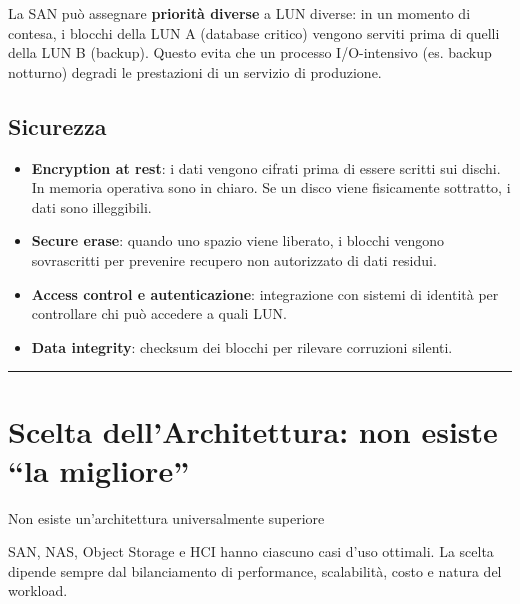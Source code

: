 \documentclass[
  italian,
  openany]{book}
\providecommand{\tightlist}{%
  \setlength{\itemsep}{0pt}\setlength{\parskip}{0pt}}
\begin{document}
La SAN può assegnare \textbf{priorità diverse} a LUN diverse: in un
momento di contesa, i blocchi della LUN A (database critico) vengono
serviti prima di quelli della LUN B (backup). Questo evita che un
processo I/O-intensivo (es. backup notturno) degradi le prestazioni di
un servizio di produzione.

\subsection{Sicurezza}\label{sicurezza-1}

\begin{itemize}
\tightlist
\item
  \textbf{Encryption at rest}: i dati vengono cifrati prima di essere
  scritti sui dischi. In memoria operativa sono in chiaro. Se un disco
  viene fisicamente sottratto, i dati sono illeggibili.
\item
  \textbf{Secure erase}: quando uno spazio viene liberato, i blocchi
  vengono sovrascritti per prevenire recupero non autorizzato di dati
  residui.
\item
  \textbf{Access control e autenticazione}: integrazione con sistemi di
  identità per controllare chi può accedere a quali LUN.
\item
  \textbf{Data integrity}: checksum dei blocchi per rilevare corruzioni
  silenti.
\end{itemize}

\begin{center}\rule{0.5\linewidth}{0.5pt}\end{center}

\section{Scelta dell'Architettura: non esiste ``la
migliore''}\label{scelta-dellarchitettura-non-esiste-la-migliore}

\begin{calloutwarning}{Non esiste un’architettura universalmente superiore}

SAN, NAS, Object Storage e HCI hanno ciascuno casi d'uso ottimali. La
scelta dipende sempre dal bilanciamento di performance, scalabilità,
costo e natura del workload.

\end{calloutwarning}
\end{document}
